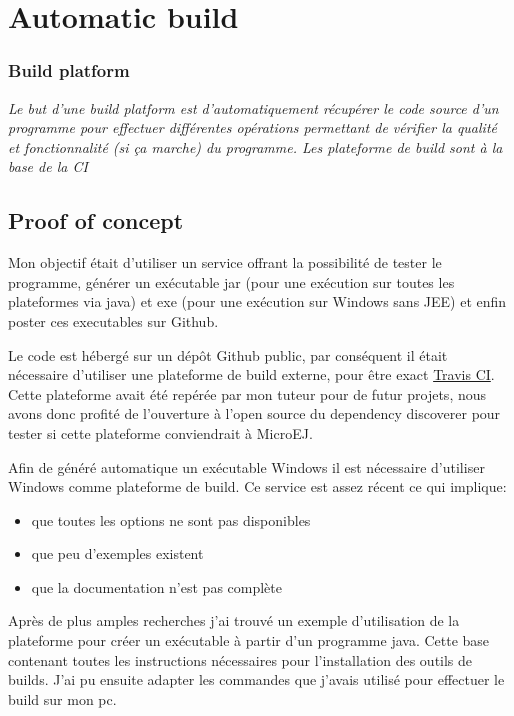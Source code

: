 \documentclass[french,a4paper,12pt]{report}
\begin{document}
\section{Automatic build}

\subsubsection{Build platform}

\textit{Le but d’une build platform est d’automatiquement récupérer le code source d’un programme pour effectuer différentes opérations permettant de vérifier la qualité et fonctionnalité (si ça marche) du programme. Les plateforme de build sont à la base de la CI}

\subsection{Proof of concept}

Mon objectif était d'utiliser un service offrant la possibilité de tester le programme, générer un exécutable jar (pour une exécution sur toutes les plateformes via java) et exe (pour une exécution sur Windows sans JEE) et enfin poster ces executables sur Github. 

Le code est hébergé sur un dépôt Github public, par conséquent il était nécessaire d’utiliser une plateforme de build externe, pour être exact \href{https://travis-ci.com/}{Travis CI}. Cette plateforme avait été repérée par mon tuteur pour de futur projets, nous avons donc profité de l'ouverture à l'open source du dependency discoverer pour tester si cette plateforme conviendrait à MicroEJ.

Afin de généré automatique un exécutable Windows il est nécessaire d’utiliser Windows comme plateforme de build. Ce service est assez récent ce qui implique:

\begin{itemize}

 \item que toutes les options ne sont pas disponibles
 \item que peu d’exemples existent
 \item que la documentation n’est pas complète

\end{itemize}

Après de plus amples recherches j’ai trouvé un exemple d’utilisation de la plateforme pour créer un exécutable à partir d’un programme java. Cette base contenant toutes les instructions nécessaires pour l’installation des outils de builds. J’ai pu ensuite adapter les commandes que j’avais utilisé pour effectuer le build sur mon pc. 
\end{document}
